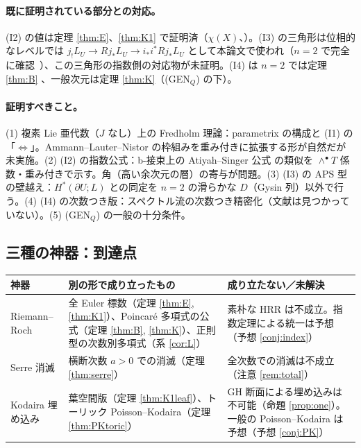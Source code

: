 \paragraph{既に証明されている部分との対応。}(I2) の値は定理 \ref{thm:E}、\ref{thm:K1} で証明済（$\chi(X)$、\tP）。(I3) の三角形は位相的なレベルでは $j_!L_U\to Rj_*L_U\to i_*i^*Rj_*L_U$ として本論文で使われ（$n=2$ で完全に確認\tP\ \tV）、この三角形の指数側の対応物が未証明。(I4) は $n=2$ では定理 \ref{thm:B} \tP、一般次元は定理 \ref{thm:K}（(GEN$_Q$) の下）\tP。
\paragraph{証明すべきこと。}(1) 複素 Lie 亜代数（$J$ なし）上の Fredholm 理論：parametrix の構成と (I1) の「$\Leftrightarrow$」。Ammann--Lauter--Nistor の枠組みを重み付きに拡張する形が自然だが未実施。(2) (I2) の指数公式：b-接束上の Atiyah--Singer 公式 \cite{BLS} の類似を $\wedge^\bullet T$ 係数・重み付きで示す。角（高い余次元の層）の寄与が問題。(3) (I3) の APS 型の壁越え：$H^*(\partial U;L)$ との同定を $n=2$ の滑らかな $D$（Gysin 列）以外で行う。(4) (I4) の次数つき版：スペクトル流の次数つき精密化（文献は見つかっていない）。(5) (GEN$_Q$) の一般の十分条件。

\subsection{三種の神器：到達点}
\begin{center}\small
\begin{tabular}{>{\raggedright\arraybackslash}p{2.4cm}>{\raggedright\arraybackslash}p{6.5cm}>{\raggedright\arraybackslash}p{6.0cm}}
\toprule 神器 & 別の形で成り立ったもの & 成り立たない／未解決\\\midrule
Riemann--Roch & 全 Euler 標数（定理 \ref{thm:E}, \ref{thm:K1}）、Poincar\'e 多項式の公式（定理 \ref{thm:B}, \ref{thm:K}）、正則型の次数別多項式（系 \ref{cor:L}） & 素朴な HRR は不成立。指数定理による統一は予想（予想 \ref{conj:index}）\\\midrule
Serre 消滅 & 横断次数 $a>0$ での消滅（定理 \ref{thm:serre}） & 全次数での消滅は不成立（注意 \ref{rem:total}）\\\midrule
Kodaira 埋め込み & 葉空間版（定理 \ref{thm:K1leaf}）、トーリック Poisson--Kodaira（定理 \ref{thm:PKtoric}） & GH 断面による埋め込みは不可能（命題 \ref{prop:one}）。一般の Poisson--Kodaira は予想（予想 \ref{conj:PK}）\\\bottomrule
\end{tabular}
\end{center}

